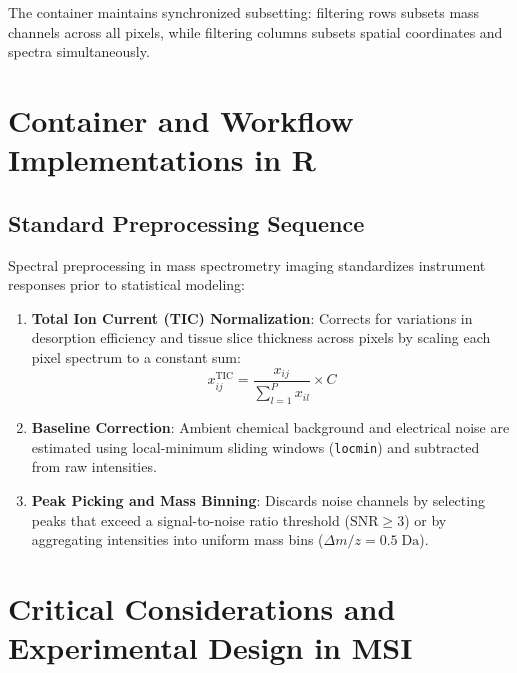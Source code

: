 \documentclass[11pt,twoside,openright]{book}
\begin{document}
The container maintains synchronized subsetting: filtering rows subsets mass channels across all pixels, while filtering columns subsets spatial coordinates and spectra simultaneously.

\section{Container and Workflow Implementations in R}

\subsection{Standard Preprocessing Sequence}

Spectral preprocessing in mass spectrometry imaging standardizes instrument responses prior to statistical modeling:

\begin{enumerate}
    \item \textbf{Total Ion Current (TIC) Normalization}: Corrects for variations in desorption efficiency and tissue slice thickness across pixels by scaling each pixel spectrum to a constant sum:
    \begin{equation}
    x_{ij}^{\text{TIC}} = \frac{x_{ij}}{\sum_{l=1}^{P} x_{il}} \times C
    \label{eq:tic_norm}
    \end{equation}
    \item \textbf{Baseline Correction}: Ambient chemical background and electrical noise are estimated using local-minimum sliding windows (\texttt{locmin}) and subtracted from raw intensities.
    \item \textbf{Peak Picking and Mass Binning}: Discards noise channels by selecting peaks that exceed a signal-to-noise ratio threshold ($\text{SNR} \ge 3$) or by aggregating intensities into uniform mass bins ($\Delta m/z = 0.5\;\text{Da}$).
\end{enumerate}

\section{Critical Considerations and Experimental Design in MSI}
\end{document}
